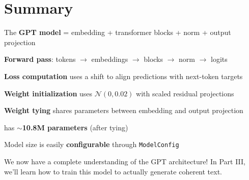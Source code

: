 \section{Summary}

\begin{summary}
    \item The \textbf{GPT model} = embedding + transformer blocks + norm + output projection
    \item \textbf{Forward pass}: tokens $\to$ embeddings $\to$ blocks $\to$ norm $\to$ logits
    \item \textbf{Loss computation} uses a shift to align predictions with next-token targets
    \item \textbf{Weight initialization} uses $\mathcal{N}(0, 0.02)$ with scaled residual projections
    \item \textbf{Weight tying} shares parameters between embedding and output projection
    \item \TryLM has $\sim$\textbf{10.8M parameters} (after tying)
    \item Model size is easily \textbf{configurable} through \texttt{ModelConfig}
\end{summary}

We now have a complete understanding of the GPT architecture! In Part III, we'll learn how to train this model to actually generate coherent text.
